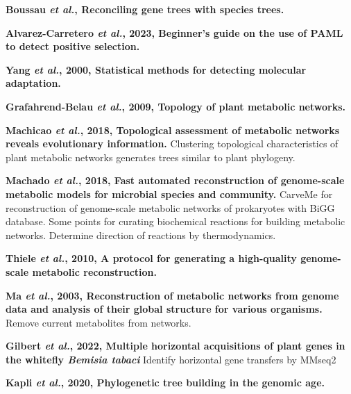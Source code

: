 \documentclass[11pt]{article}
\begin{document}
\begin{sloppypar}
\par
\textbf{Boussau \textit{et al.}, Reconciling gene trees with species trees.} \newline
\par
\textbf{Alvarez-Carretero \textit{et al.}, 2023, Beginner's guide on the use of PAML to detect positive selection.} \newline
\par
\textbf{Yang \textit{et al.}, 2000, Statistical methods for detecting molecular adaptation.} \newline
\par
\textbf{Grafahrend-Belau \textit{et al.}, 2009, Topology of plant metabolic networks.} \newline
\par
\textbf{Machicao \textit{et al.}, 2018, Topological assessment of metabolic networks reveals evolutionary information.} \newline
Clustering topological characteristics of plant metabolic networks generates trees similar to plant phylogeny. 
\par
\textbf{Machado \textit{et al.}, 2018, Fast automated reconstruction of genome-scale metabolic models for microbial species and community.} \newline
CarveMe for reconstruction of genome-scale metabolic networks of prokaryotes with BiGG database. 
Some points for curating biochemical reactions for building metabolic networks. 
Determine direction of reactions by thermodynamics.
\par
\textbf{Thiele \textit{et al.}, 2010, A protocol for generating a high-quality genome-scale metabolic reconstruction.} \newline
\par
\textbf{Ma \textit{et al.}, 2003, Reconstruction of metabolic networks from genome data and analysis of their global structure for various organisms.} \newline
Remove current metabolites from networks.
\par
\textbf{Gilbert \textit{et al.}, 2022, Multiple horizontal acquisitions of plant genes in the whitefly \textit{Bemisia tabaci}} \newline
Identify horizontal gene transfers by MMseq2
\par
\textbf{Kapli \textit{et al.}, 2020, Phylogenetic tree building in the genomic age.} \newline
\par



\end{sloppypar}
\end{document}
